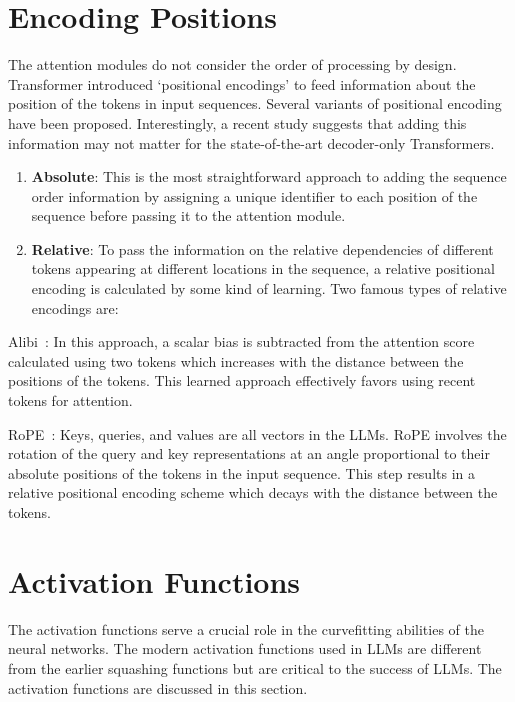 \documentclass[a4paper,oneside]{book}
\begin{document}
\section{Encoding Positions}
The attention modules do not consider the order of processing by design. Transformer introduced `positional encodings' to feed information about the position of the tokens in input sequences. Several variants of positional encoding have been proposed. Interestingly, a recent study suggests that adding this information may not matter for the state-of-the-art decoder-only Transformers.

\begin{enumerate}
    \item \textbf{Absolute}: This is the most straightforward approach to adding the sequence order information by assigning a unique identifier to each position of the sequence before passing it to the attention module.

    \item \textbf{Relative}: To pass the information on the relative dependencies of different tokens appearing at different locations in the sequence, a relative positional encoding is calculated by some kind of learning. Two famous types of relative encodings are:
\end{enumerate}

Alibi~\cite{press2021train}: In this approach, a scalar bias is subtracted from the attention score calculated using two tokens which increases with the distance between the positions of the tokens. This learned approach effectively favors using recent tokens for attention.

RoPE~\cite{su2024roformer}: Keys, queries, and values are all vectors in the LLMs. RoPE involves the rotation of the query and key representations at an angle proportional to their absolute positions of the tokens in the input sequence. This step results in a relative positional encoding scheme which decays with the distance between the tokens.

\section{Activation Functions}
The activation functions serve a crucial role in the curvefitting abilities of the neural networks. The modern activation functions used in LLMs are different from the earlier squashing functions but are critical to the success of LLMs. The activation functions are discussed in this section.
\end{document}
